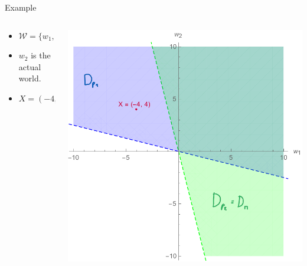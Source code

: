 \documentclass[aspectratio=169, dvipsnames]{beamer}
\newcommand{\W}{\mathcal{W}}
\begin{document}
\begin{frame}{Example}
  \begin{columns}
    \begin{column}{.38\linewidth}
      \begin{itemize}
      \item $\W = \{w_1,w_2\}$
      \item $w_2$ is the actual world.
      \item $X = (-4, 4)$
      \end{itemize}
    \end{column}
    \begin{column}{.6\linewidth}
      \begin{center}
        \includegraphics[width=.92\textwidth]{TTFailure1.pdf}
      \end{center}
    \end{column}
  \end{columns}
\end{frame}
\end{document}
